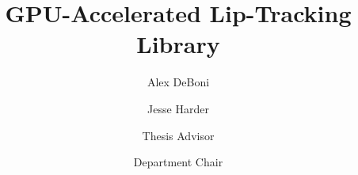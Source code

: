 \documentclass[twoside]{scu-thesis}
\author{Alex DeBoni}
\author{Jesse Harder}
\title{GPU-Accelerated Lip-Tracking Library}
\begin{document}
\frontmatter
\signature{Thesis Advisor}
\signature{Department Chair}

\maketitle


\tableofcontents
\listoffigures

\mainmatter
















\backmatter

\end{document}
